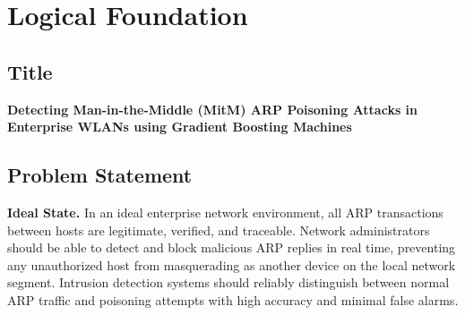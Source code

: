 \documentclass[12pt,a4paper]{article}
\begin{document}
\begin{abstract}
\noindent
Address Resolution Protocol (ARP) poisoning is one of the most prevalent
Man-in-the-Middle (MitM) attack vectors in enterprise Wireless Local Area Networks
(WLANs), enabling attackers to silently intercept, alter, or drop network traffic
between legitimate hosts. Traditional rule-based and signature-driven ARP protection
mechanisms fail against sophisticated, low-rate poisoning attempts that evade static
detection thresholds. This proposal presents a machine learning approach to ARP
poisoning detection using Gradient Boosting Machines (GBM), leveraging network
flow-level features extracted from enterprise WLAN traffic. Using the CIC-IDS2017
and a custom-generated ARP poisoning dataset captured in a controlled lab environment,
the study trains and evaluates XGBoost, LightGBM, and CatBoost classifiers, comparing
their detection accuracy, precision, recall, F1-score, and false positive rate against
baseline methods including Random Forest and SVM. The proposed GBM-based detection
framework aims to achieve a detection accuracy exceeding 98\% and a false positive rate
below 2\%, providing a practical, deployable solution for enterprise network
administrators to detect MitM ARP poisoning attacks in real time.
\end{abstract}

\tableofcontents
\newpage

\section{Logical Foundation}

\subsection{Title}

\textbf{Detecting Man-in-the-Middle (MitM) ARP Poisoning Attacks in Enterprise
WLANs using Gradient Boosting Machines}

\subsection{Problem Statement}

\textbf{Ideal State.}
In an ideal enterprise network environment, all ARP transactions between hosts
are legitimate, verified, and traceable. Network administrators should be able
to detect and block malicious ARP replies in real time, preventing any unauthorized
host from masquerading as another device on the local network segment. Intrusion
detection systems should reliably distinguish between normal ARP traffic and
poisoning attempts with high accuracy and minimal false alarms.
\end{document}
